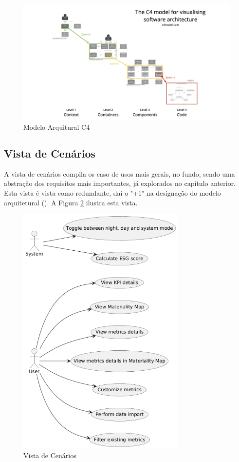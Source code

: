 \begin{figure}[H]
    \centering
    \includegraphics[width=\linewidth,keepaspectratio]{frontmatter/assets/diagrams/c4-overview.png}
    \caption{Modelo Arquitural C4}
    \label{fig:c4model}
\end{figure}


\subsection{Vista de Cenários}

A vista de cenários compila os caso de usos mais gerais, no fundo, sendo uma abstração dos requisitos mais importantes, já explorados no capítulo anterior. Esta vista é vista como redundante, daí o "+1" na designação do modelo arquitetural (\cite{Kruchten1995}). A Figura \ref{fig:scenario_view} ilustra esta vista.

\begin{figure}[H]
    \centering
    \includegraphics[height=5in,keepaspectratio]{frontmatter/assets/diagrams/Scenario View/Scenario_View.png}
    \caption{Vista de Cenários}
    \label{fig:scenario_view}
\end{figure}

